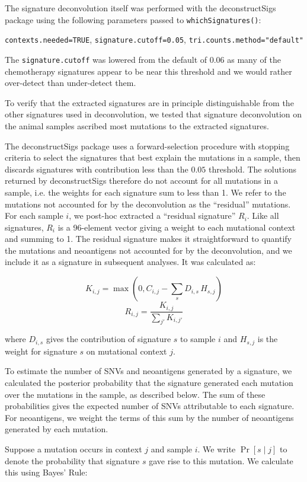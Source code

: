 The signature deconvolution itself was performed with the deconstructSigs\cite{Rosenthal_2016} package using the following parameters passed to \texttt{whichSignatures()}:

\texttt{contexts.needed=TRUE}, \texttt{signature.cutoff=0.05}, \texttt{tri.counts.method="default"}

The \texttt{signature.cutoff} was lowered from the default of $0.06$ as many of the chemotherapy signatures appear to be near this threshold and we would rather over-detect than under-detect them.

To verify that the extracted signatures are in principle distinguishable from the other signatures used in deconvolution, we tested that signature deconvolution on the animal samples ascribed most mutations to the extracted signatures.

The deconstructSigs package uses a forward-selection procedure with stopping criteria to select the signatures that best explain the mutations in a sample, then discards signatures with contribution less than the $0.05$ threshold. The solutions returned by deconstructSigs therefore do not account for all mutations in a sample, i.e. the weights for each signature sum to less than 1. We refer to the mutations not accounted for by the deconvolution as the ``residual'' mutations. For each sample $i$, we post-hoc extracted a ``residual signature'' $R_i$. Like all signatures, $R_i$ is a 96-element vector giving a weight to each mutational context and summing to 1. The residual signature makes it straightforward to quantify the mutations and neoantigens not accounted for by the deconvolution, and we include it as a signature in subsequent analyses. It was calculated as:

\[ K_{i,j} = \max(0, C_{i,j} - \sum_s{D_{i,s} \, H_{s, j}}) \]
\[ R_{i,j} = \frac{K_{i, j}}{\sum_{j'}{K_{i,j'}}} \]

where $D_{i,s}$ gives the contribution of signature $s$ to sample $i$ and $H_{s,j}$ is the weight for signature $s$ on mutational context $j$.

To estimate the number of SNVs and neoantigens generated by a signature, we calculated the posterior probability that the signature generated each mutation over the mutations in the sample, as described below. The sum of these probabilities gives the expected number of SNVs attributable to each signature. For neoantigens, we weight the terms of this sum by the number of neoantigens generated by each mutation.

Suppose a mutation occurs in context $j$ and sample $i$. We write $\Pr[s \mid j]$ to denote the probability that signature $s$ gave rise to this mutation. We calculate this using Bayes' Rule:

